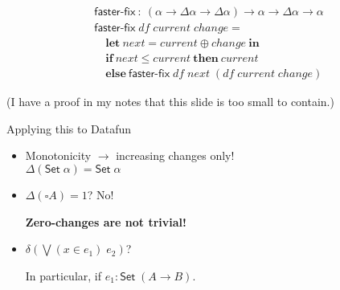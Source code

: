 \documentclass{beamer}
\newcommand{\ms}{\mathsf}
\newcommand{\mb}{\mathbf}
\begin{document}

\begin{frame}
  \large
  \[\begin{array}{l}
  \textsf{faster-fix} ~:~ (\alpha \to \Delta \alpha \to \Delta \alpha)
  \to \alpha \to \Delta \alpha \to \alpha\\
  \textsf{faster-fix} \; df \; current \; change =\\
  \quad \mb{let}~ next = current \oplus change ~\mb{in}\\
  \quad \mb{if}~ next \le current ~\mb{then}~ current\\
  \quad \mb{else}~ \textsf{faster-fix} \; df \; next \; (df \; current \; change)
  \end{array}\]



  \vspace{0.5cm}

  \small (I have a proof in my notes that
  this slide is too small to contain.)
\end{frame}

\begin{frame}{Applying this to Datafun}
  \large
  \begin{itemize}
  \item Monotonicity $\to$ increasing changes only!\\
    $\Delta(\ms{Set}\; \alpha) = \ms{Set}\;\alpha$

    \vspace{0.2cm}

  \item $\Delta(\square A) = 1$? No!

    \textbf{Zero-changes are not trivial!}

    \vspace{0.2cm}

  \item $\delta (\bigvee(x \in e_1)\; e_2)$?

    In particular, if $e_1 : \ms{Set}\; (A \to B)$.

    \vspace{0.2cm}

  \end{itemize}
\end{frame}
\end{document}
